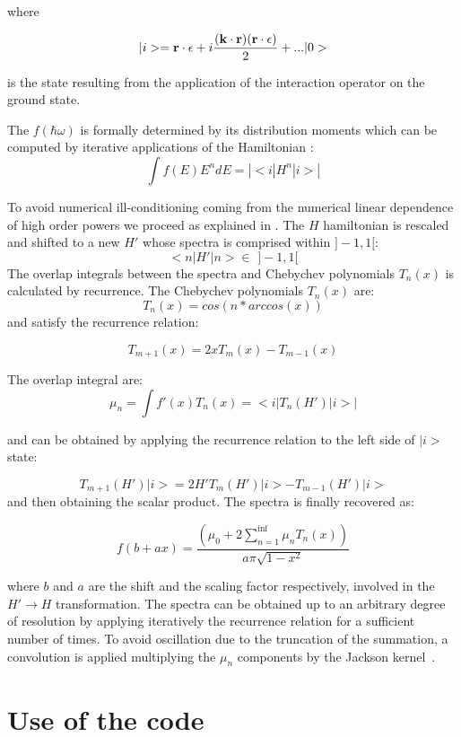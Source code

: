 \documentclass[a4paper,11pt]{report}
\begin{document}
where 

\begin{equation}
  |i> = { {\bf  r} \cdot  {\bf \epsilon} }  + i\frac{( { \bf k \cdot r})(  {\bf  r \cdot  \epsilon })}{2} +... | 0 > 
\end{equation}

is the state resulting from the application of the interaction operator on the ground state.

 The $f(\hbar \omega)$ is formally determined by its distribution moments
which can be computed by iterative applications of the Hamiltonian :
\begin{equation}
  \int  f(E) E^n d E = \left| < i | H^n| i > \right|
\end{equation}

To avoid numerical ill-conditioning coming from the numerical linear dependence of  high order powers we proceed as explained in \cite{weiss}.
 The $H$ hamiltonian is rescaled  and shifted to a new $H'$ whose spectra
is comprised within $]-1,1[$:
$$   < n | H' | n > \in \,\, ]-1,1[ $$
The overlap integrals between the spectra and Chebychev polynomials $T_n(x)$ is calculated by recurrence.
The Chebychev polynomials $T_n(x)$ are:
$$  T_n(x) = cos( n * arccos(x)) $$
and satisfy the recurrence relation:

$$ T_{m+1}(x) = 2 x T_m(x) - T_{m-1} (x)$$

The overlap integral are:
$$\mu_n =  \int  f'(x) T_n(x) = < i |  T_n(H') | i > | $$

and can be obtained by applying the recurrence relation to the left side of $|i>$ state:

$$ T_{m+1}(H')| i > = 2 H' T_m(H')| i > - T_{m-1} (H')| i > $$
and then obtaining the scalar product. The spectra is finally recovered as:

$$  f( b+a x) = \frac{  (\mu_0+ 2 \sum_{n=1}^{\inf} \mu_n T_n(x)) }{a \pi \sqrt{1 - x^2} } $$

where $b$ and $a$ are the shift and the scaling factor respectively, involved in the $ H' \rightarrow H $ transformation.
The spectra can be obtained up to an arbitrary degree of resolution by
applying iteratively the recurrence relation for a sufficient number of times. To avoid oscillation
due to the truncation of the summation, a convolution is applied multiplying the $\mu_n$ 
components by the Jackson kernel~\cite{weiss}. 


\section{Use of the code}
\end{document}

